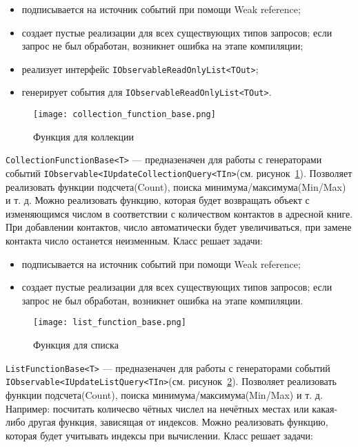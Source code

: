 \begin{itemize}
  \item подписывается на источник событий при помощи Weak reference;
  \item создает пустые реализации для всех существующих типов запросов; если запрос не был обработан, возникнет ошибка на этапе компиляции;
  \item реализует интерфейс \lstinline[style=csharpinlinestyle]!IObservableReadOnlyList<TOut>!;
  \item генерирует события для \lstinline[style=csharpinlinestyle]!IObservableReadOnlyList<TOut>!.
\end{itemize}

\begin{figure}[ht]
\centering
  \texttt{[image: collection\_function\_base.png]}
  \caption{ Функция для коллекции }
  \label{fig:collection_function_base}
\end{figure}

\lstinline[style=csharpinlinestyle]!CollectionFunctionBase<T>! --- предназеначен для работы с генераторами событий
\lstinline[style=csharpinlinestyle]!IObservable<IUpdateCollectionQuery<TIn>!(см. рисунок~\ref{fig:collection_function_base}).
Позволяет реализовать функции подсчета(Count), поиска минимума/максимума(Min/Max) и т. д.
Можно реализовать функцию, которая будет возвращать объект с изменяющимся числом в соответствии с количеством контактов в адресной книге.
При добавлении контактов, число автоматически будет увеличиваться, при замене контакта число останется неизменным.
Класс решает задачи:

\begin{itemize}
  \item подписывается на источник событий при помощи Weak reference;
  \item создает пустые реализации для всех существующих типов запросов; если запрос не был обработан, возникнет ошибка на этапе компиляции.
\end{itemize}

\begin{figure}[ht]
\centering
  \texttt{[image: list\_function\_base.png]}
  \caption{ Функция для списка }
  \label{fig:list_function_base}
\end{figure}

\lstinline[style=csharpinlinestyle]!ListFunctionBase<T>! --- предназеначен для работы с генераторами событий
\lstinline[style=csharpinlinestyle]!IObservable<IUpdateListQuery<TIn>!(см. рисунок~\ref{fig:list_function_base}).
Позволяет реализовать функции подсчета(Count), поиска минимума/максимума(Min/Max) и т. д. Например: посчитать количесво чётных числел на нечётных местах или какая-либо другая функция,
зависящая от индексов. Можно реализовать функцию, которая будет учитывать индексы при вычислении.
Класс решает задачи:

